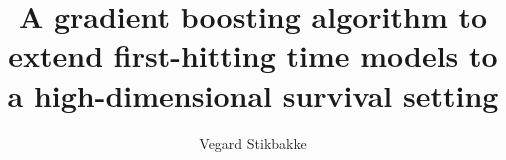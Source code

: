 \documentclass[a4paper, USenglish, dvipsnames, svgnames, cmyk]{memoir}
\title{A gradient boosting algorithm to extend first-hitting time models to a high-dimensional survival setting}
\author
{
    Vegard Stikbakke
}
\begin{document}
    \frontmatter        %

    \masterfrontpage

    

    \cleartorecto
    \begin{KeepFromToc}
      \tableofcontents
    \end{KeepFromToc}

    \mainmatter         %

    

    

    

    

    

    

    

    

    \appendix           %
    \appendixpage       %

    

    

    \backmatter         %

    
    
\end{document}
